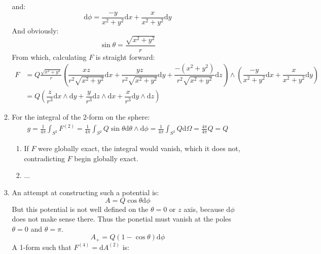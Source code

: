 \documentclass[12pt,a4]{article}
\newcommand{\e}{\mathrm{d}}
\begin{document}
\begin{enumerate}
\begin{enumerate}
\begin{equation*}
        \end{equation*}
        and:
        \begin{equation*}
          \e \phi = \dfrac{-y}{x^2+y^2} \e x + \dfrac{x}{x^2+y^2} \e y
        \end{equation*}
        And obviously:
        \begin{equation*}
          \sin \theta = \frac{\sqrt{x^2 + y^2}}{r}
        \end{equation*}
        From which, calculating $F$ is straight forward:
        \begin{align*}
          F &= Q \frac{\sqrt{x^2 + y^2}}{r} \left(\dfrac{xz}{r^2\sqrt{x^2+y^2}} \e x + \dfrac{yz}{r^2\sqrt{x^2+y^2}} \e y + \dfrac{-\left(x^2 + y^2\right)}{r^2\sqrt{x^2+y^2}} \e z\right) \wedge \left(\dfrac{-y}{x^2+y^2} \e x + \dfrac{x}{x^2+y^2} \e y\right)\\
            &= Q \left(\dfrac{z}{r^3} \e x \wedge \e y + \dfrac{y}{r^3} \e z \wedge \e x + \dfrac{x}{r^3} \e y \wedge \e z\right)
        \end{align*}
      \item
        For the integral of the 2-form on the sphere:
        \begin{align*}
          g =
          \frac{1}{4 \pi}\int_{S^2} F^{(2)} =
          \frac{1}{4 \pi}\int_{S^2} Q \sin \theta \e \theta \wedge \e \phi =
          \frac{1}{4 \pi}\int_{S^2} Q \e \Omega =
          \frac{4 \pi}{4 \pi} Q  = Q
        \end{align*}
        \begin{enumerate}
          \item
            If $F$ were globally exact, the integral would vanish, which it does not, contradicting $F$ begin globally exact.
          \item
            ...
        \end{enumerate}
      \item
        An attempt at constructing such a potential is:
        \begin{equation*}
          A = Q \cos \theta \e \phi
        \end{equation*}
        But this potential is not well defined on the $\theta = 0$ or $z$ axis, because $\e \phi$ does not make sense there.
        Thus the ponetial must vanish at the poles $\theta = 0$ and $\theta = \pi$.
        \begin{equation*}
          A_+ = Q (1 - \cos \theta) \e \phi
        \end{equation*}
        A 1-form such that $F^{(4)} = \e A^{(2)}$ is:

\end{enumerate}
\end{enumerate}
\end{document}
